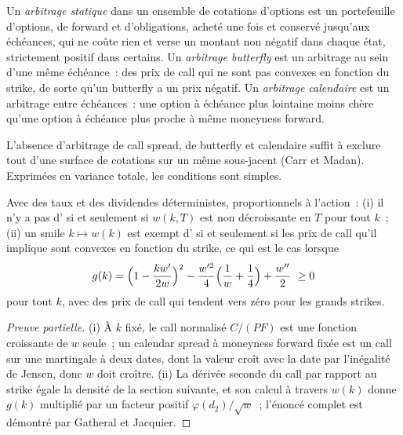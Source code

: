\begin{definition}\label{def:dv:implied-volatility-and-its-surface:static}
Un \emph{arbitrage statique} dans un ensemble de cotations d'options est un portefeuille
d'options, de forward et d'obligations, acheté une fois et conservé jusqu'aux échéances, qui
ne coûte rien et verse un montant non négatif dans chaque état, strictement positif dans certains. Un
\emph{arbitrage butterfly} est un arbitrage au sein d'une même échéance~: des prix de call
qui ne sont pas convexes en fonction du strike, de sorte qu'un butterfly a un prix négatif. Un
\emph{arbitrage calendaire} est un arbitrage entre échéances~: une option à échéance plus lointaine
moins chère qu'une option à échéance plus proche à même moneyness forward.
\end{definition}

L'absence d'arbitrage de call spread, de butterfly et calendaire suffit à exclure tout
 d'une surface de cotations sur un même sous-jacent (Carr et Madan). Exprimées en
variance totale, les conditions sont simples.

\begin{proposition}\label{prop:dv:implied-volatility-and-its-surface:static}
Avec des taux et des dividendes déterministes, proportionnels à l'action~: (i) il n'y a pas
d' si et seulement si $w(k,T)$ est non décroissante en $T$ pour tout $k$~; (ii) un smile
$k\mapsto w(k)$ est exempt d' si et seulement si les prix de call qu'il implique
sont convexes en fonction du strike, ce qui est le cas lorsque
\[
g(k)=\Bigl(1-\frac{kw'}{2w}\Bigr)^2-\frac{w'^2}{4}\Bigl(\frac1w+\frac14\Bigr)+\frac{w^{\prime\prime}}{2}\ \ge0
\]
pour tout $k$, avec des prix de call qui tendent vers zéro pour les grands strikes.
\end{proposition}
\begin{proof}[Preuve partielle]
(i) À $k$ fixé, le call normalisé $C/(PF)$ est une fonction croissante de $w$ seule~; un calendar spread
à moneyness forward fixée est un call sur une martingale à deux dates, dont la valeur croît
avec la date par l'inégalité de Jensen, donc $w$ doit croître. (ii) La dérivée seconde du call
par rapport au strike égale la densité de la section suivante, et son calcul à travers $w(k)$
donne $g(k)$ multiplié par un facteur positif $\varphi(d_2)/\sqrt w$~; l'énoncé complet
est démontré par Gatheral et Jacquier.
\end{proof}

